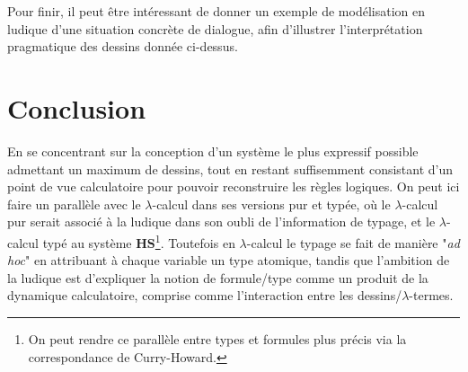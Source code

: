 \documentclass[12pt]{report}
\begin{document}
Pour finir, il peut être intéressant de donner un exemple de modélisation en ludique d'une situation concrète de dialogue, afin d'illustrer l'interprétation pragmatique des dessins donnée ci-dessus.


\chapter*{Conclusion}




En se concentrant sur la conception d'un système le plus expressif possible admettant un maximum de dessins, tout en restant suffisemment consistant d'un point de vue calculatoire pour pouvoir reconstruire les règles logiques. On peut ici faire un parallèle avec le $\lambda$-calcul dans ses versions pur et typée, où le $\lambda$-calcul pur serait associé à la ludique dans son oubli de l'information de typage, et le $\lambda$-calcul typé au système $\mathbf{HS}$\footnote{On peut rendre ce parallèle entre types et formules plus précis via la correspondance de Curry-Howard.}. Toutefois en $\lambda$-calcul le typage se fait de manière "\textit{ad hoc}" en attribuant à chaque variable un type atomique, tandis que l'ambition de la ludique est d'expliquer la notion de formule/type comme un produit de la dynamique calculatoire, comprise comme l'interaction entre les dessins/$\lambda$-termes.

\nocite{Tai68}
\nocite{Lec11}
\nocite{Gir03}
\nocite{Gir06}



\end{document}
